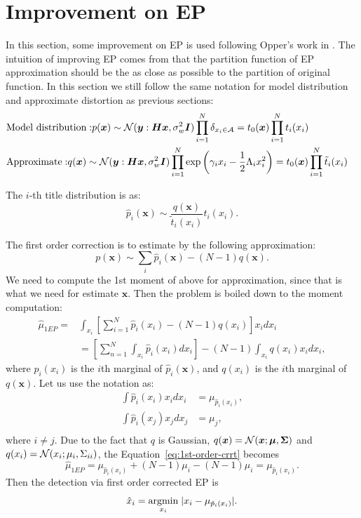 \documentclass{article}
\begin{document}
\section{Improvement on EP}\label{sec:imporveEP}
In this section, some improvement on EP is used following Opper's work in \cite{opper2008imp_ep}. The intuition of improving EP comes from that the partition function of EP approximation should be the as close as possible to the partition of original function. In this section we still follow the same notation for model distribution and approximate distortion as previous sections:
\begin{align}
  &\mathrm{Model~ distribution:} p(\bm{x}) \sim \mathcal{N}(\bm{y}: \bm{H}\bm{x}, \sigma_{w}^2\bm{I})\prod_{i=1}^{N}\delta_{{x_i}\in \mathcal{A}} = t_0(\bm{x})\prod_{i=1}^{N}t_i(x_i)\\
  &\mathrm{Approximate:} q(\bm{x}) \sim \mathcal{N}(\bm{y}: \bm{H}\bm{x}, \sigma_{w}^2\bm{I}) \prod_{i=1}^{N} \exp\left( \gamma_i x_i - \frac{1}{2}\Lambda_i x_i^2 \right)=t_0(\bm{x})\prod_{i=1}^{N}\tilde{t}_i(x_i)&
\end{align}

The $i$-th title distribution is as:
\begin{equation}
  \hat{p}_i(\bm{x}) \sim \frac{q(\bm{x})}{\tilde{t}_i(x_i)} t_i(x_i).
\end{equation}

The first order correction is to estimate by the following approximation:
\begin{equation}\label{eq:imp-ep-1order}
  p(\bm{x}) \sim \sum_{i} \hat{p}_i(\bm{x}) - (N-1) q(\bm{x}).
\end{equation}
We need to compute the 1st moment of above for approximation, since that is what we need for estimate $\bm{x}$. Then the problem is boiled down to the moment computation:
\begin{align}\label{eq:1st-order-crrt}
  \hat{\mu}_{1EP}=&\int_{x_i}\left[ \sum_{i=1}^{N} \hat{p}_i(x_i) - (N-1)q(x_i) \right]x_i d x_i \nonumber\\
                  &=\left[ \sum_{n=1}^{N} \int_{x_i}\hat{p}_i(x_i) d x_i \right] - (N-1)\int_{x_i}q(x_i) x_i d x_i,
\end{align}
where $\hat{p}_i(x_i)$ is the $i$th marginal of $\hat{p}_i(\bm{x})$, and $q(x_i)$ is the $i$th marginal of $q(\bm{x})$. Let us use the notation as:
\begin{align}
  \int \hat{p}_i(x_i) x_i d x_i &= \mu_{\hat{p}_i(x_i)}, \\
  \int \hat{p}_i(x_j) x_j d x_j &= \mu_{j}, \\
\end{align}
where $i \neq j$. Due to the fact that $q$ is Gaussian, $q(\bm{x}) = \mathcal{N}(\bm{x}; \bm{\mu}, \bm{\Sigma})$ and $q(x_i) = \mathcal{N}(x_i; \mu_i, \Sigma_{ii})$, the Equation~\eqref{eq:1st-order-crrt} becomes
\begin{equation}
  \hat{\mu}_{1EP} = \mu_{\hat{p}_i(x_i)} + (N-1) \mu_i - (N-1) \mu_i = \mu_{\hat{p}_i(x_i)}.
\end{equation}
Then the detection via first order corrected EP is
\begin{equation}
  \hat{x}_i = \underset{x_i}{\operatorname{argmin}}\; | x_i - \mu_{\hat{p}_i(x_i)} |.
\end{equation}
\end{document}
